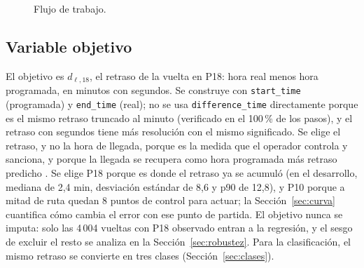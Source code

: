 \documentclass[conference,spanish]{IEEEtran}
\begin{document}
\begin{figure}[t]
\centering
{}
\caption{Flujo de trabajo.}
\label{fig:pipeline}
\end{figure}

\subsection{Variable objetivo}\label{sec:objetivo}
El objetivo es $d_{\ell,18}$, el retraso de la vuelta en P18: hora real menos hora programada, en minutos con segundos. Se construye con \texttt{start\_time} (programada) y \texttt{end\_time} (real); no se usa \texttt{difference\_time} directamente porque es el mismo retraso truncado al minuto (verificado en el 100\,\% de los pasos), y el retraso con segundos tiene más resolución con el mismo significado. Se elige el retraso, y no la hora de llegada, porque es la medida que el operador controla y sanciona, y porque la llegada se recupera como hora programada más retraso predicho \cite{hu2022deepreta,wang2018wdr}. Se elige P18 porque es donde el retraso ya se acumuló (en el desarrollo, mediana de 2,4 min, desviación estándar de 8,6 y p90 de 12,8), y P10 porque a mitad de ruta quedan 8 puntos de control para actuar; la Sección~\ref{sec:curva} cuantifica cómo cambia el error con ese punto de partida. El objetivo nunca se imputa: solo las 4\,004 vueltas con P18 observado entran a la regresión, y el sesgo de excluir el resto se analiza en la Sección~\ref{sec:robustez}. Para la clasificación, el mismo retraso se convierte en tres clases (Sección~\ref{sec:clases}).
\end{document}
